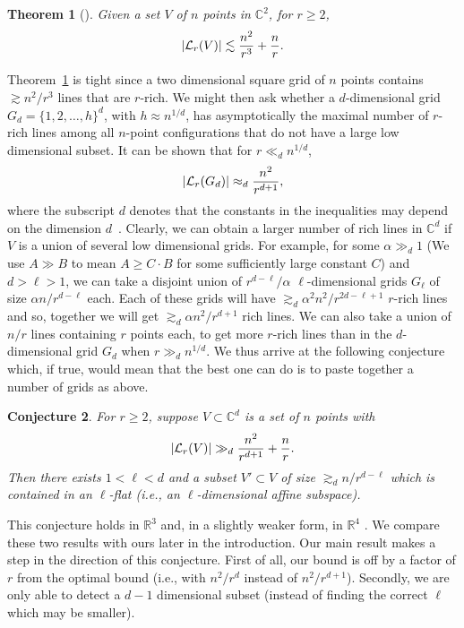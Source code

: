 \documentclass[11pt]{article}
\newtheorem{thm}{Theorem}[section]
\newtheorem{conjecture}[thm]{Conjecture}
\def\R{{\mathbb{R}}}
\def\C{{\mathbb{C}}}
\def\cL{{\cal L}}
\begin{document}
\begin{thm}[\cite{Toth,Zahl}]
\label{thm-r-richlines-2dimensions}
Given a set  $V$ of $n$ points in $\C^2$, for $r\ge 2$,
$$|\cL_r(V)|\lesssim \frac{n^2}{r^3}+\frac{n}{r}.$$
\end{thm}

Theorem~\ref{thm-r-richlines-2dimensions} is tight since a two dimensional square grid of $n$ points contains $\gtrsim n^2/r^3$ lines that are $r$-rich. We might then ask whether a $d$-dimensional grid $G_d = \{1,2,\ldots,h\}^d$, with $h \approx n^{1/d}$, has asymptotically the maximal number of $r$-rich lines among all $n$-point configurations that do not have a large low dimensional subset. It can be shown that for $r\ll_d n^{1/d}$,$$|\cL_r(G_d)| \approx_d \frac{n^2}{r^{d+1}},$$  where the subscript $d$ denotes that the constants in the inequalities may depend on the dimension $d$~\cite{SoVu04}.
Clearly, we can obtain a larger number of rich lines in $\C^d$ if $V$ is a union of several low dimensional grids. For example, for some $\alpha\gg_d 1$ (We use $A \gg B$ to mean $A \geq C\cdot B$ for some sufficiently large constant $C$) and $d>\ell>1$, we can  take a disjoint union of $r^{d-\ell}/\alpha$ $\ell$-dimensional grids $G_{\ell}$ of size $\alpha n/r^{d-\ell}$ each. Each of these grids will have $\gtrsim_d \alpha^2n^2/r^{2d-\ell+1}$ $r$-rich lines and so, together we will get $\gtrsim_d \alpha n^2/r^{d+1}$ rich lines. We can also take a union of $n/r$ lines containing $r$ points each, to get more $r$-rich lines than in the $d$-dimensional grid $G_d$ when $r\gg_d n^{1/d}$. We thus arrive at the following conjecture which, if true, would mean that the best one can do is to paste together a number of grids as above.

\begin{conjecture}\label{conj-rich}
For $r\ge 2$, suppose $V \subset \C^d$ is a set of $n$ points with $$|\cL_r(V)| \gg_d \frac{n^2}{r^{d+1}}+\frac{n}{r}.$$ Then there exists $1<\ell<d$ and  a subset $V' \subset V$ of size $ \gtrsim_d n/r^{d-\ell}$ which is contained in an $\ell$-flat (i.e., an $\ell$-dimensional affine subspace).
\end{conjecture}

This conjecture holds in $\R^3$ \cite{GK10} and, in a slightly weaker form, in $\R^4$ \cite{SS14}. We compare these two results with ours later in the introduction.
Our main result makes a step in the direction of this conjecture. First of all, our bound is off by a factor of $r$ from the optimal bound (i.e., with $n^2/r^{d}$ instead of $n^2/r^{d+1}$). Secondly, we are only able to detect a $d-1$ dimensional subset (instead of finding the correct $\ell$ which may be smaller).
\end{document}

